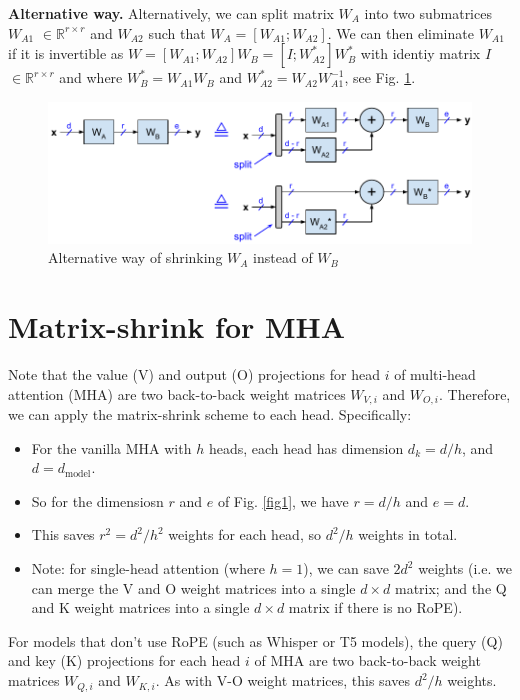 \documentclass{article}
\newcommand{\eR}[2]{$\in \mathbb{R}^{#1 \times #2}$}  %
\begin{document}
\textbf{Alternative way.} Alternatively, we can split matrix $W_A$ into two submatrices $W_{A1}$ \eR{r}{r} and $W_{A2}$ such that $W_A = [W_{A1}; W_{A2}]$. We can then eliminate $W_{A1}$ if it is invertible as $W = [W_{A1}; W_{A2}] W_B = [I; W_{A2}^\ast] W_B^\ast$ with identiy matrix $I$ \eR{r}{r} and where $W_B^\ast = W_{A1} W_B$ and $W_{A2}^\ast = W_{A2} W_{A1}^{-1}$, see Fig. \ref{fig2}.
\begin{figure}[h!] \centering
  \includegraphics[scale=0.88]{../doc/fig/matShrink_fig2.pdf}
  \caption{Alternative way of shrinking $W_A$ instead of $W_B$}
\label{fig2} \end{figure}

\section{Matrix-shrink for MHA}
Note that the value (V) and output (O) projections for head $i$ of multi-head attention (MHA) are two back-to-back weight matrices $W_{V,i}$ and $W_{O,i}$. Therefore, we can apply the matrix-shrink scheme to each head. Specifically:
\begin{itemize}[topsep=-1pt, itemsep=-1pt]
  \item For the vanilla MHA with $h$ heads, each head has dimension $d_k = d / h$, and $d = d_\text{model}$.
  \item So for the dimensiosn $r$ and $e$ of Fig. \ref{fig1}, we have  $r = d / h$ and $e = d$.
  \item This saves $r^2 = d^2 / h^2$ weights for each head, so $d^2 / h$ weights in total.
  \item Note: for single-head attention (where $h = 1$), we can save $2 d^2$ weights (i.e. we can merge the V and O weight matrices into a single $d \times d$ matrix; and the Q and K weight matrices into a single $d \times d$ matrix if there is no RoPE).
\end{itemize}

For models that don’t use RoPE (such as Whisper or T5 models), the query (Q) and key (K) projections for each head $i$ of MHA are two back-to-back weight matrices $W_{Q,i}$ and $W_{K,i}$. As with V-O weight matrices, this saves $d^2 / h$ weights.
\end{document}
